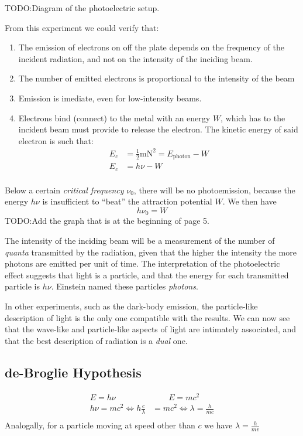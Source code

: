 \documentclass{article}[10pt]
\begin{document}
TODO:\@ Diagram of the photoelectric setup.

From this experiment we could verify that:
\begin{enumerate}
	\item The emission of electrons on off the plate depends on the frequency of
	      the incident radiation, and not on the intensity of the inciding beam.
	\item The number of emitted electrons is proportional to the intensity of
	      the beam
	\item Emission is imediate, even for low-intensity beams.
	\item Electrons bind (connect) to the metal with an energy $W$, which has to
	      the incident beam must provide to release the electron. The kinetic
	      energy of said electron is such that:
	      \begin{align*}
	      	E_c & = \frac{1}{2}\si{\metre\newton}^2 = E_{\text{photon}} - W \\
	      	E_c & = h\nu - W                                                \\
	      \end{align*}
\end{enumerate}
Below a certain \emph{critical frequency} $\nu_0$, there will be no
photoemission, because the energy $h\nu$ is insufficient to ``beat''
the attraction potential $W$. We then have
$$h\nu_0 = W$$
TODO:\@ Add the graph that is at the beginning of page 5.

The intensity of the inciding beam will be a measurement of the number of
\emph{quanta} transmitted by the radiation, given that the higher the intensity
the more photons are emitted per unit of time. The interpretation of the
photoelectric effect suggests that light is a particle, and that the energy for
each transmitted particle is $h\nu$. Einstein named these particles \emph{photons}.

In other experiments, such as the dark-body emission, the particle-like
description of light is the only one compatible with the results. We can now see
that the wave-like and particle-like aspects of light are intimately associated,
and that the best description of radiation is a \emph{dual} one.
\subsection{de-Broglie Hypothesis}
\begin{align*}
	E=h\nu                            & \qquad E=mc^2                      \\
	h\nu=mc^2 \iff h\frac{c}{\lambda} & = mc^2 \iff \lambda = \frac{h}{mc} \\
\end{align*}
Analogally, for a particle moving at speed other than $c$ we have $\lambda = \frac{h}{mv}$
\end{document}
